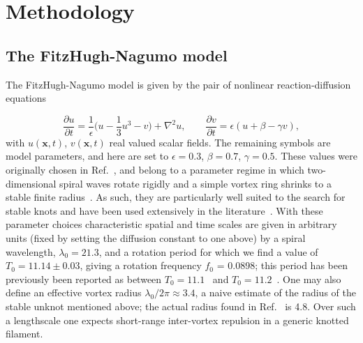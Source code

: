 \section{\label{sec:Methodology} Methodology}

\subsection{The FitzHugh-Nagumo model}
The FitzHugh-Nagumo model is given by the pair of nonlinear reaction-diffusion equations

\begin{equation}
\label{eq:FN}
\frac{\partial u}{ \partial t} = \frac{1}{\epsilon}\biggl(u - \frac{1}{3}u^3 -v\biggr) + \nabla^{2} u,\hspace{2em}    \frac{\partial v}{ \partial t} = {\epsilon}(u + \beta -\gamma v) ,
\end{equation}
with $u(\mathbf{x},t)$, $ v(\mathbf{x},t)$ real valued scalar fields. The remaining symbols are model parameters, and here are set to $\epsilon = 0.3$, $\beta=0.7$, $\gamma = 0.5$. These values were originally chosen in Ref.~\citep{Henze1993}, and belong to a parameter regime in which two-dimensional spiral waves rotate rigidly and a simple vortex ring shrinks to a stable finite radius~\citep{Courtemanche1990}. As such, they are particularly well suited to the search for stable knots and have been used extensively in the literature~\citep{Henze1993,WinfreeChapter,Sutcliffe2003,Maucher2016,Maucher2017,Maucher2018,Maucher2019}. With these parameter choices characteristic spatial and time scales are given in arbitrary units (fixed by setting the diffusion constant to one above) by a spiral wavelength, $\lambda_0 = 21.3$, and a rotation period for which we find a value of $T_0=11.14 \pm 0.03$, giving a rotation frequency $f_0$ = 0.0898; this period has been previously been reported as between $T_0 = 11.1$~\citep{Henze1993} and $T_0= 11.2$~\citep{Sutcliffe2003}. One may also define an effective vortex radius $\lambda_0/2\pi \approx 3.4$, a naive estimate of the radius of the stable unknot mentioned above; the actual radius found in Ref.~\citep{Courtemanche1990} is 4.8. Over such a lengthscale one expects short-range inter-vortex repulsion in a generic knotted filament.

